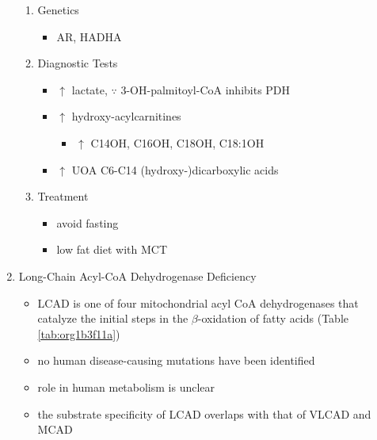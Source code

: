 \documentclass{scrartcl}
\begin{document}
\begin{enumerate}
\begin{enumerate}
\item Genetics
\label{sec:org0d46358}
\begin{itemize}
\item AR, HADHA
\end{itemize}

\item Diagnostic Tests
\label{sec:orgcc3750c}
\begin{itemize}
\item \(\uparrow\) lactate, \(\because\) 3-OH-palmitoyl-CoA inhibits PDH
\item \(\uparrow\) hydroxy-acylcarnitines
\begin{itemize}
\item \(\uparrow\) C14OH, C16OH, C18OH, C18:1OH
\end{itemize}
\item \(\uparrow\) UOA C6-C14 (hydroxy-)dicarboxylic acids
\end{itemize}

\item Treatment
\label{sec:orgbda81bc}
\begin{itemize}
\item avoid fasting
\item low fat diet with MCT
\end{itemize}
\end{enumerate}
\item Long-Chain Acyl-CoA Dehydrogenase Deficiency
\label{sec:org77110ed}
\begin{itemize}
\item LCAD is one of four mitochondrial acyl CoA dehydrogenases that
catalyze the initial steps in the \(\beta\)-oxidation of fatty acids
(Table \ref{tab:org1b3f11a})
\item no human disease-causing mutations have been identified
\item role  in  human  metabolism  is unclear
\item the substrate specificity of LCAD overlaps with that of
VLCAD and MCAD
\end{itemize}


\end{enumerate}
\end{document}
